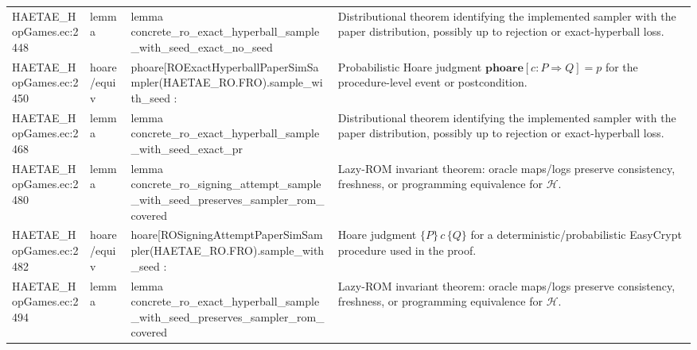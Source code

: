 \documentclass[10pt]{article}
\begin{document}
\begin{longtable}{L{0.11\textwidth}L{0.055\textwidth}L{0.385\textwidth}L{0.41\textwidth}}
HAETAE\_\allowbreak{}HopGames.\allowbreak{}ec:\allowbreak{}2448 & lemma & {\ttfamily\scriptsize lemma concrete\_\allowbreak{}ro\_\allowbreak{}exact\_\allowbreak{}hyperball\_\allowbreak{}sample\_\allowbreak{}with\_\allowbreak{}seed\_\allowbreak{}exact\_\allowbreak{}no\_\allowbreak{}seed} & Distributional theorem identifying the implemented sampler with the paper distribution, possibly up to rejection or exact-hyperball loss. \\
HAETAE\_\allowbreak{}HopGames.\allowbreak{}ec:\allowbreak{}2450 & hoare/equiv & {\ttfamily\scriptsize phoare[ROExactHyperballPaperSimSampler(HAETAE\_\allowbreak{}RO.FRO).sample\_\allowbreak{}with\_\allowbreak{}seed :} & Probabilistic Hoare judgment $\mathbf{phoare}[c:P\Rightarrow Q]=p$ for the procedure-level event or postcondition. \\
HAETAE\_\allowbreak{}HopGames.\allowbreak{}ec:\allowbreak{}2468 & lemma & {\ttfamily\scriptsize lemma concrete\_\allowbreak{}ro\_\allowbreak{}exact\_\allowbreak{}hyperball\_\allowbreak{}sample\_\allowbreak{}with\_\allowbreak{}seed\_\allowbreak{}exact\_\allowbreak{}pr} & Distributional theorem identifying the implemented sampler with the paper distribution, possibly up to rejection or exact-hyperball loss. \\
HAETAE\_\allowbreak{}HopGames.\allowbreak{}ec:\allowbreak{}2480 & lemma & {\ttfamily\scriptsize lemma concrete\_\allowbreak{}ro\_\allowbreak{}signing\_\allowbreak{}attempt\_\allowbreak{}sample\_\allowbreak{}with\_\allowbreak{}seed\_\allowbreak{}preserves\_\allowbreak{}sampler\_\allowbreak{}rom\_\allowbreak{}covered} & Lazy-ROM invariant theorem: oracle maps/logs preserve consistency, freshness, or programming equivalence for $\mathcal H$. \\
HAETAE\_\allowbreak{}HopGames.\allowbreak{}ec:\allowbreak{}2482 & hoare/equiv & {\ttfamily\scriptsize hoare[ROSigningAttemptPaperSimSampler(HAETAE\_\allowbreak{}RO.FRO).sample\_\allowbreak{}with\_\allowbreak{}seed :} & Hoare judgment $\{P\}\,c\,\{Q\}$ for a deterministic/probabilistic EasyCrypt procedure used in the proof. \\
HAETAE\_\allowbreak{}HopGames.\allowbreak{}ec:\allowbreak{}2494 & lemma & {\ttfamily\scriptsize lemma concrete\_\allowbreak{}ro\_\allowbreak{}exact\_\allowbreak{}hyperball\_\allowbreak{}sample\_\allowbreak{}with\_\allowbreak{}seed\_\allowbreak{}preserves\_\allowbreak{}sampler\_\allowbreak{}rom\_\allowbreak{}covered} & Lazy-ROM invariant theorem: oracle maps/logs preserve consistency, freshness, or programming equivalence for $\mathcal H$. \\

\end{longtable}
\end{document}
